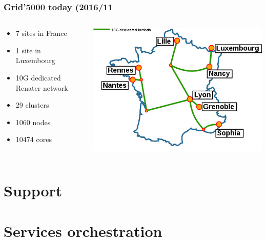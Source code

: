 \documentclass[11pt,compress]{beamer}
\begin{document}
\begin{frame}
\frametitle{Grid'5000 today (2016/11}
\begin{columns}[c]
  \begin{column}{6cm}
	\begin{itemize}
	\item 7 sites in France
	\item 1 site in Luxembourg
	\item 10G dedicated Renater network
	\item 29 clusters
	\item 1060 nodes
	\item 10474 cores
	\end{itemize}
  \end{column}
  \begin{column}{6cm}
	\includegraphics[scale=0.42]{figures/Renater5-g5k}
  \end{column}
\end{columns}
\end{frame}

\section{Support}
\subsection{}
\begin{frame}

\end{frame}

\section{Services orchestration}
\end{document}

